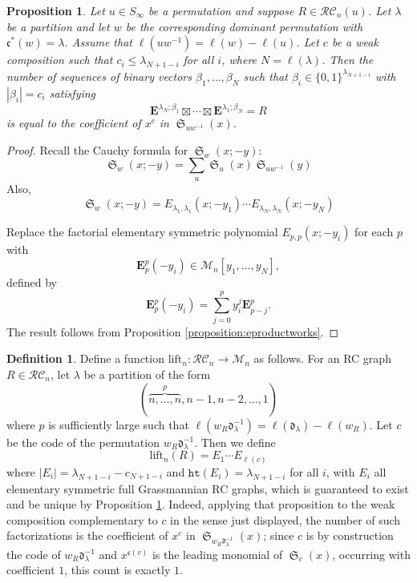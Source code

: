\documentclass{amsart}
\newtheorem{proposition}[lemma]{Proposition}
\theoremstyle{definition}
\newtheorem{definition}[lemma]{Definition}
\theoremstyle{remark}
\numberwithin{equation}{subsection}
\DeclareMathOperator{\sch}{\mathfrak{S}}
\newcommand{\wof}[1]{w_{#1}}
\newcommand{\hr}{\mathtt{ht}}
\newcommand{\RC}{\mathcal{RC}}
\newcommand{\dom}{\mathfrak{d}}
\newcommand{\code}{\mathfrak{c}}
\begin{document}
\begin{proposition} \label{proposition:elemfactor}
  Let $u\in S_\infty$ be a permutation and suppose $R\in \RC_n(u)$. Let $\lambda$ be a partition and let $w$ be the corresponding dominant permutation with $\code^*(w)=\lambda$. Assume that $\ell(uw^{-1}) = \ell(w)-\ell(u)$. Let $c$ be a weak composition such that $c_i\leq \lambda_{N + 1 - i}$ for all $i$, where $N=\ell(\lambda)$. Then the number of sequences of binary vectors $\beta_1,\ldots,\beta_N$ such that $\beta_i\in\{0,1\}^{\lambda_{N + 1 - i}}$ with $|\beta_i|=c_i$ satisfying
  $$\mathbf{E}^{\lambda_N;\beta_1}\boxtimes\cdots\boxtimes \mathbf{E}^{\lambda_1;\beta_N} = R$$
is equal to the coefficient of $x^c$ in $\sch_{uw^{-1}}(x)$.
\end{proposition}
\begin{proof}
  Recall the Cauchy formula for $\sch_w(x;-y)$:
  $$\sch_w(x;-y)=\sum_u \sch_u(x)\sch_{uw^{-1}}(y)$$
  Also,
  $$\sch_w(x;-y) = E_{\lambda_1,\lambda_1}(x;-y_1)\cdots E_{\lambda_N,\lambda_N}(x;-y_N)$$

Replace the factorial elementary symmetric polynomial $E_{p,p}(x;-y_i)$ for each $p$ with
$$\mathbf{E}_p^p(-y_i)\in \mathcal{M}_n[y_1,\ldots,y_N],$$
defined by
$$\mathbf{E}_p^p(-y_i) = \sum_{j=0}^p y_i^j \mathbf{E}_{p-j}^p.$$ 
The result follows from Proposition \ref{proposition:eproductworks}.
\end{proof}



\begin{definition}
  Define a function $\mathrm{lift}_n:\RC_n\to \mathcal{M}_n$ as follows. For an RC graph $R\in \RC_n$, let $\lambda$ be a partition of the form 
$$(\overbrace{n,\ldots,n}^{p},n-1,n-2,\ldots,1)$$
where $p$ is sufficiently large such that $\ell(\wof{R}\dom_\lambda^{-1}) = \ell(\dom_\lambda) - \ell(\wof{R})$.  Let $c$ be the code of the permutation $\wof{R}\dom_\lambda^{-1}$. Then we define
$$\mathrm{lift}_n(R) = E_1 \cdots  E_{\ell(c)}$$
where $|E_i| = \lambda_{N + 1 - i} - c_{N + 1 - i}$ and $\hr(E_i) = \lambda_{N+1-i}$ for all $i$, with $E_i$ all elementary symmetric full Grassmannian RC graphs, which is guaranteed to exist and be unique by Proposition \ref{proposition:elemfactor}. Indeed, applying that proposition to the weak composition complementary to $c$ in the sense just displayed, the number of such factorizations is the coefficient of $x^{c}$ in $\sch_{\wof{R}\dom_\lambda^{-1}}(x)$; since $c$ is by construction the code of $\wof{R}\dom_\lambda^{-1}$ and $x^{\code(v)}$ is the leading monomial of $\sch_v(x)$, occurring with coefficient $1$, this count is exactly $1$. 
\end{definition}
\end{document}
